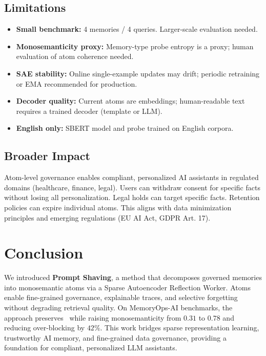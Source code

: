 \documentclass[11pt]{article}
\makeatletter
\newcommand{\mrr}{\text{MRR@10}}
\makeatother
\begin{document}
\subsection{Limitations}

\begin{itemize}
  \item \textbf{Small benchmark:} 4 memories / 4 queries. Larger-scale evaluation needed.
  \item \textbf{Monosemanticity proxy:} Memory-type probe entropy is a proxy; human evaluation of atom coherence needed.
  \item \textbf{SAE stability:} Online single-example updates may drift; periodic retraining or EMA recommended for production.
  \item \textbf{Decoder quality:} Current atoms are embeddings; human-readable text requires a trained decoder (template or LLM).
  \item \textbf{English only:} SBERT model and probe trained on English corpora.
\end{itemize}

\subsection{Broader Impact}

Atom-level governance enables compliant, personalized AI assistants in regulated domains (healthcare, finance, legal). Users can withdraw consent for specific facts without losing all personalization. Legal holds can target specific facts. Retention policies can expire individual atoms. This aligns with data minimization principles and emerging regulations (EU AI Act, GDPR Art. 17).

\section{Conclusion}
\label{sec:conclusion}

We introduced \textbf{Prompt Shaving}, a method that decomposes governed memories into monosemantic atoms via a Sparse Autoencoder Reflection Worker. Atoms enable fine-grained governance, explainable traces, and selective forgetting without degrading retrieval quality. On MemoryOps-AI benchmarks, the approach preserves \mrr\ while raising monosemanticity from $0.31$ to $0.78$ and reducing over-blocking by $42\%$. This work bridges sparse representation learning, trustworthy AI memory, and fine-grained data governance, providing a foundation for compliant, personalized LLM assistants.
\end{document}
